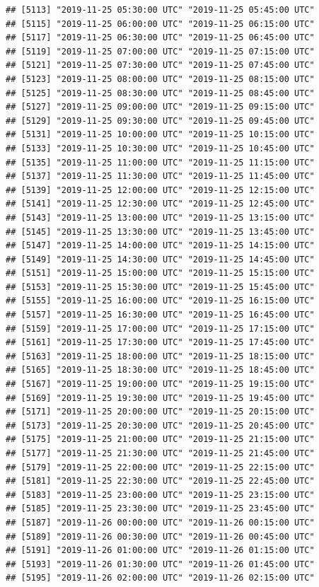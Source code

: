 \documentclass{article}\usepackage[]{graphicx}\usepackage[]{color}
\makeatletter
\newenvironment{kframe}{%
 \def\at@end@of@kframe{}%
 \ifinner\ifhmode%
  \def\at@end@of@kframe{\end{minipage}}%
  \begin{minipage}{\columnwidth}%
 \fi\fi%
 \def\FrameCommand##1{\hskip\@totalleftmargin \hskip-\fboxsep
 \colorbox{shadecolor}{##1}\hskip-\fboxsep
     \hskip-\linewidth \hskip-\@totalleftmargin \hskip\columnwidth}%
 \MakeFramed {\advance\hsize-\width
   \@totalleftmargin\z@ \linewidth\hsize
   \@setminipage}}%
 {\par\unskip\endMakeFramed%
 \at@end@of@kframe}
\newenvironment{knitrout}{}{} %
\makeatother
\begin{document}
\begin{knitrout}
\begin{kframe}
\begin{verbatim}
## [5113] "2019-11-25 05:30:00 UTC" "2019-11-25 05:45:00 UTC"
## [5115] "2019-11-25 06:00:00 UTC" "2019-11-25 06:15:00 UTC"
## [5117] "2019-11-25 06:30:00 UTC" "2019-11-25 06:45:00 UTC"
## [5119] "2019-11-25 07:00:00 UTC" "2019-11-25 07:15:00 UTC"
## [5121] "2019-11-25 07:30:00 UTC" "2019-11-25 07:45:00 UTC"
## [5123] "2019-11-25 08:00:00 UTC" "2019-11-25 08:15:00 UTC"
## [5125] "2019-11-25 08:30:00 UTC" "2019-11-25 08:45:00 UTC"
## [5127] "2019-11-25 09:00:00 UTC" "2019-11-25 09:15:00 UTC"
## [5129] "2019-11-25 09:30:00 UTC" "2019-11-25 09:45:00 UTC"
## [5131] "2019-11-25 10:00:00 UTC" "2019-11-25 10:15:00 UTC"
## [5133] "2019-11-25 10:30:00 UTC" "2019-11-25 10:45:00 UTC"
## [5135] "2019-11-25 11:00:00 UTC" "2019-11-25 11:15:00 UTC"
## [5137] "2019-11-25 11:30:00 UTC" "2019-11-25 11:45:00 UTC"
## [5139] "2019-11-25 12:00:00 UTC" "2019-11-25 12:15:00 UTC"
## [5141] "2019-11-25 12:30:00 UTC" "2019-11-25 12:45:00 UTC"
## [5143] "2019-11-25 13:00:00 UTC" "2019-11-25 13:15:00 UTC"
## [5145] "2019-11-25 13:30:00 UTC" "2019-11-25 13:45:00 UTC"
## [5147] "2019-11-25 14:00:00 UTC" "2019-11-25 14:15:00 UTC"
## [5149] "2019-11-25 14:30:00 UTC" "2019-11-25 14:45:00 UTC"
## [5151] "2019-11-25 15:00:00 UTC" "2019-11-25 15:15:00 UTC"
## [5153] "2019-11-25 15:30:00 UTC" "2019-11-25 15:45:00 UTC"
## [5155] "2019-11-25 16:00:00 UTC" "2019-11-25 16:15:00 UTC"
## [5157] "2019-11-25 16:30:00 UTC" "2019-11-25 16:45:00 UTC"
## [5159] "2019-11-25 17:00:00 UTC" "2019-11-25 17:15:00 UTC"
## [5161] "2019-11-25 17:30:00 UTC" "2019-11-25 17:45:00 UTC"
## [5163] "2019-11-25 18:00:00 UTC" "2019-11-25 18:15:00 UTC"
## [5165] "2019-11-25 18:30:00 UTC" "2019-11-25 18:45:00 UTC"
## [5167] "2019-11-25 19:00:00 UTC" "2019-11-25 19:15:00 UTC"
## [5169] "2019-11-25 19:30:00 UTC" "2019-11-25 19:45:00 UTC"
## [5171] "2019-11-25 20:00:00 UTC" "2019-11-25 20:15:00 UTC"
## [5173] "2019-11-25 20:30:00 UTC" "2019-11-25 20:45:00 UTC"
## [5175] "2019-11-25 21:00:00 UTC" "2019-11-25 21:15:00 UTC"
## [5177] "2019-11-25 21:30:00 UTC" "2019-11-25 21:45:00 UTC"
## [5179] "2019-11-25 22:00:00 UTC" "2019-11-25 22:15:00 UTC"
## [5181] "2019-11-25 22:30:00 UTC" "2019-11-25 22:45:00 UTC"
## [5183] "2019-11-25 23:00:00 UTC" "2019-11-25 23:15:00 UTC"
## [5185] "2019-11-25 23:30:00 UTC" "2019-11-25 23:45:00 UTC"
## [5187] "2019-11-26 00:00:00 UTC" "2019-11-26 00:15:00 UTC"
## [5189] "2019-11-26 00:30:00 UTC" "2019-11-26 00:45:00 UTC"
## [5191] "2019-11-26 01:00:00 UTC" "2019-11-26 01:15:00 UTC"
## [5193] "2019-11-26 01:30:00 UTC" "2019-11-26 01:45:00 UTC"
## [5195] "2019-11-26 02:00:00 UTC" "2019-11-26 02:15:00 UTC"

\end{verbatim}
\end{kframe}
\end{knitrout}
\end{document}
